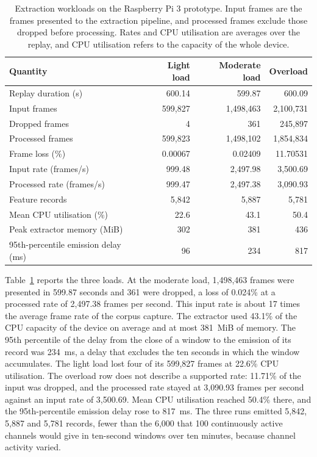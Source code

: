 \begin{table}[tbp]
  \centering
  \caption{Extraction workloads on the Raspberry Pi 3 prototype. Input frames are the frames
  presented to the extraction pipeline, and processed frames exclude those dropped before
  processing. Rates and CPU utilisation are averages over the replay, and CPU utilisation refers
  to the capacity of the whole device.}
  \label{tab:anomaly:iuno-pi}
  \small
  \begin{tabular}{@{}lrrr@{}}
    \toprule
    Quantity & Light load & Moderate load & Overload \\
    \midrule
    Replay duration (s)                 &  600.14 &    599.87 &    600.09 \\
    Input frames                        & 599,827 & 1,498,463 & 2,100,731 \\
    Dropped frames                      &       4 &       361 &   245,897 \\
    Processed frames                    & 599,823 & 1,498,102 & 1,854,834 \\
    Frame loss (\%)                     & 0.00067 &   0.02409 &  11.70531 \\
    Input rate (frames/s)               &  999.48 &  2,497.98 &  3,500.69 \\
    Processed rate (frames/s)           &  999.47 &  2,497.38 &  3,090.93 \\
    Feature records                     &   5,842 &     5,887 &     5,781 \\
    \midrule
    Mean CPU utilisation (\%)           &    22.6 &      43.1 &      50.4 \\
    Peak extractor memory (MiB)         &     302 &       381 &       436 \\
    95th-percentile emission delay (ms) &      96 &       234 &       817 \\
    \bottomrule
  \end{tabular}
\end{table}

Table~\ref{tab:anomaly:iuno-pi} reports the three loads. At the moderate load, 1,498,463 frames
were presented in 599.87 seconds and 361 were dropped, a loss of 0.024\% at a processed
rate of 2,497.38 frames per second. This input rate is about 17 times the average frame rate of
the corpus capture. The extractor used 43.1\% of the CPU capacity of the device on average
and at most 381~MiB of memory. The 95th percentile of the delay from the close of a window to the
emission of its record was 234~ms, a delay that excludes the ten seconds in which the window
accumulates. The light load lost four of its 599,827 frames at 22.6\% CPU utilisation.
The overload row does not describe a supported rate: 11.71\% of the input was dropped,
and the processed rate stayed at 3,090.93 frames per second against an input rate of 3,500.69.
Mean CPU utilisation reached 50.4\% there, and the 95th-percentile emission delay rose to
817~ms. The three runs emitted 5,842, 5,887 and 5,781 records, fewer than the 6,000 that 100
continuously active channels would give in ten-second windows over ten minutes, because channel
activity varied.


